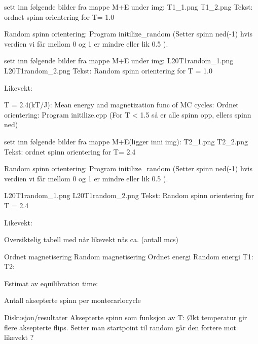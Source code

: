 \documentclass[../main.tex]{subfiles}
\begin{document}
sett inn følgende bilder fra mappe M+E under img:
T1_1.png
T1_2.png
Tekst: ordnet spinn orientering for T= 1.0

Random spinn orientering: Program initilize_random (Setter spinn ned(-1)
hvis verdien vi får mellom 0 og 1 er mindre eller lik 0.5 ).

sett inn følgende bilder fra mappe M+E under img:
L20T1random_1.png
L20T1random_2.png
Tekst: Random spinn orientering for T = 1.0


Likevekt:

T = 2.4(kT/J):
Mean energy and magnetization func of MC cycles:
Ordnet orientering: Program initilize.cpp (For T < 1.5 så er alle spinn opp,
ellers spinn ned)

sett inn følgende bilder fra mappe M+E(ligger inni img):
T2_1.png
T2_2.png
Tekst: ordnet spinn orientering for T= 2.4

Random spinn orientering: Program initilize_random (Setter spinn ned(-1)
hvis verdien vi får mellom 0 og 1 er mindre eller lik 0.5 ).

L20T1random_1.png
L20T1random_2.png
Tekst: Random spinn orientering for T = 2.4


Likevekt:

Oversiktelig tabell med når likevekt nås ca. (antall mcs)

    Ordnet magnetisering  Random magnetisering  Ordnet energi Random energi
T1:
T2:

Estimat av equilibration time:

Antall aksepterte spinn per montecarlocycle

Diskusjon/resultater
Aksepterte spinn som funksjon av T:
Økt temperatur gir flere aksepterte flips.
Setter man startpoint til random går den fortere mot likevekt ?
\end{document}
